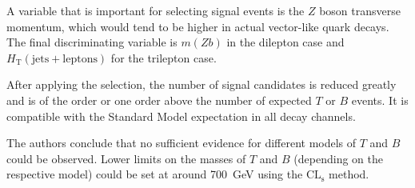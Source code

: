A variable that is important for selecting signal events is the $Z$ boson transverse momentum, which would tend to be higher in actual vector-like quark decays.
The final discriminating variable is $m(Zb)$ in the dilepton case and $H_\text{T}(\text{jets}+\text{leptons})$ for the trilepton case.

After applying the selection, the number of signal candidates is reduced greatly and is of the order or one order above the number of expected $T$ or $B$ events.
It is compatible with the Standard Model expectation in all decay channels.

The authors conclude that no sufficient evidence for different models of $T$ and $B$ could be observed.
Lower limits on the masses of $T$ and $B$ (depending on the respective model) could be set at around \SI{700}{GeV} using the $\text{CL}_\text{s}$ method.

\nocite{*}
\printbibliography


